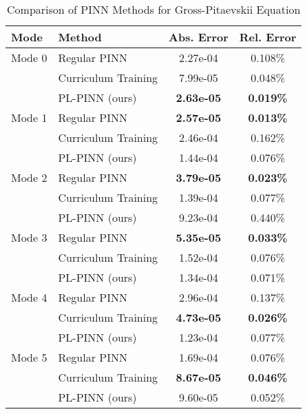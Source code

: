 \begin{table}[htbp]
\centering
\caption{Comparison of PINN Methods for Gross-Pitaevskii Equation}
\label{tab:pinn_comparison}
\begin{tabular}{llcc}
\toprule
Mode & Method & Abs. Error & Rel. Error \\
\midrule
Mode 0 & Regular PINN & 2.27e-04 & 0.108\% \\
 & Curriculum Training & 7.99e-05 & 0.048\% \\
 & PL-PINN (ours) & \textbf{2.63e-05} & \textbf{0.019\%} \\
\midrule
Mode 1 & Regular PINN & \textbf{2.57e-05} & \textbf{0.013\%} \\
 & Curriculum Training & 2.46e-04 & 0.162\% \\
 & PL-PINN (ours) & 1.44e-04 & 0.076\% \\
\midrule
Mode 2 & Regular PINN & \textbf{3.79e-05} & \textbf{0.023\%} \\
 & Curriculum Training & 1.39e-04 & 0.077\% \\
 & PL-PINN (ours) & 9.23e-04 & 0.440\% \\
\midrule
Mode 3 & Regular PINN & \textbf{5.35e-05} & \textbf{0.033\%} \\
 & Curriculum Training & 1.52e-04 & 0.076\% \\
 & PL-PINN (ours) & 1.34e-04 & 0.071\% \\
\midrule
Mode 4 & Regular PINN & 2.96e-04 & 0.137\% \\
 & Curriculum Training & \textbf{4.73e-05} & \textbf{0.026\%} \\
 & PL-PINN (ours) & 1.23e-04 & 0.077\% \\
\midrule
Mode 5 & Regular PINN & 1.69e-04 & 0.076\% \\
 & Curriculum Training & \textbf{8.67e-05} & \textbf{0.046\%} \\
 & PL-PINN (ours) & 9.60e-05 & 0.052\% \\
\bottomrule
\end{tabular}
\end{table}